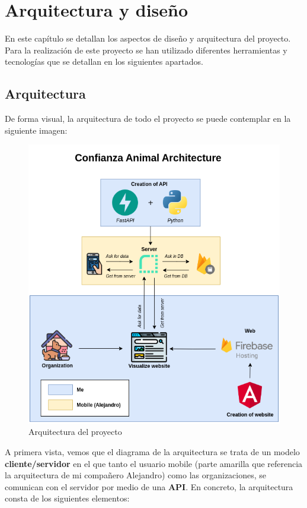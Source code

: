\chapter{Arquitectura y diseño}\label{ch:arquitectura-y-diseno}

En este capítulo se detallan los aspectos de diseño y arquitectura del proyecto. Para la realización de este proyecto
se han utilizado diferentes herramientas y tecnologías que se detallan en los siguientes apartados.

\section{Arquitectura}\label{sec:arquitectura}

De forma visual, la arquitectura de todo el proyecto se puede contemplar en la siguiente imagen:

\begin{figure}[H]
    \centering
    \includegraphics[width=1\textwidth]{imgs/arquitectura2.png}
    \caption{Arquitectura del proyecto}
    \label{fig:arquitectura}
\end{figure}

A primera vista, vemos que el diagrama de la arquitectura se trata de un modelo
\textbf{cliente/servidor} en el que tanto el usuario mobile (parte amarilla que referencia la arquitectura de mi compañero Alejandro)
como las organizaciones, se comunican con el servidor por medio de una \textbf{API}. En concreto,
la arquitectura consta de los siguientes elementos:

